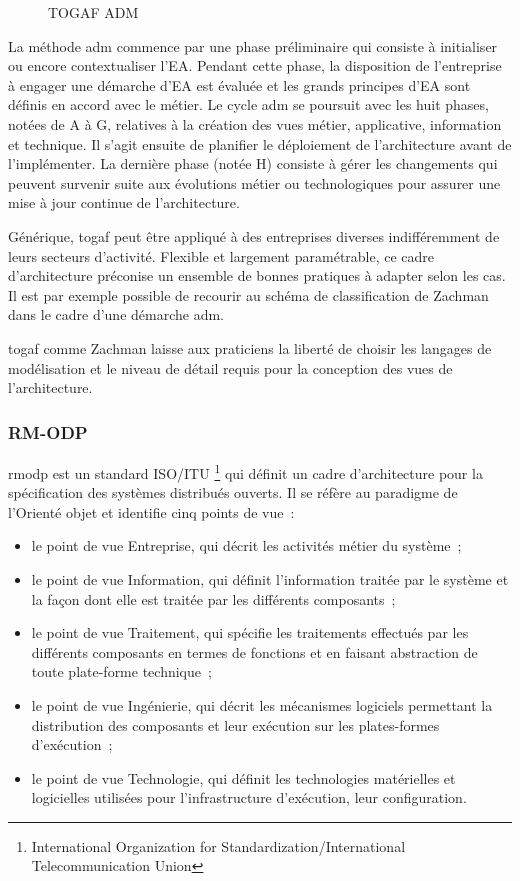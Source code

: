 \begin{figure}[!ht]
    \begin{center}
        
    \end{center}
    \caption{TOGAF ADM \protect\cite{togaf2009}}
    \label{fig:TOGAF}
\end{figure}

La méthode \gls{adm} commence par une phase préliminaire qui consiste à initialiser
ou encore contextualiser l'EA. Pendant cette phase, la disposition de
l'entreprise à engager une démarche d'EA est évaluée et les grands principes
d'EA sont définis en accord avec le métier. Le cycle \gls{adm} se poursuit avec les
huit phases, notées de A à G, relatives à la création des vues métier,
applicative, information et technique. Il s'agit ensuite de planifier le
déploiement de l'architecture avant de l'implémenter. La dernière phase (notée H)
consiste à gérer les changements qui peuvent survenir suite aux évolutions
métier ou technologiques pour assurer une mise à jour continue de
l'architecture. 

Générique, \gls{togaf} peut être appliqué à des entreprises diverses
indifféremment de leurs secteurs d'activité. Flexible et largement paramétrable, ce cadre d'architecture préconise un ensemble de bonnes pratiques à adapter selon les cas. Il est par exemple possible de recourir au schéma de classification de Zachman dans le
cadre d'une démarche \gls{adm}.

\gls{togaf} comme Zachman laisse aux praticiens la liberté de choisir les langages de
modélisation et le niveau de détail requis pour la conception des vues de
l'architecture. 

\subsubsection{RM-ODP}
\gls{rmodp} est un standard ISO/ITU \footnote{International Organization for Standardization/International Telecommunication Union} qui définit un cadre d'architecture pour la spécification des systèmes distribués ouverts.
Il se réfère au paradigme de l'Orienté objet et identifie cinq points de vue~:
\begin{itemize}
\item le point de vue Entreprise, qui décrit les activités métier du système~;
\item le point de vue Information, qui définit l'information traitée par le système et la
façon dont elle est traitée par les différents composants~;
\item le point de vue Traitement, qui spécifie les traitements effectués
par les différents composants en termes de fonctions et en faisant abstraction de toute plate-forme technique~;
\item le point de vue Ingénierie, qui décrit les mécanismes logiciels permettant la
distribution des composants et leur exécution sur les plates-formes d'exécution~;
\item le point de vue Technologie, qui définit les technologies matérielles et logicielles
utilisées pour l'infrastructure d'exécution, leur configuration.
\end{itemize}

